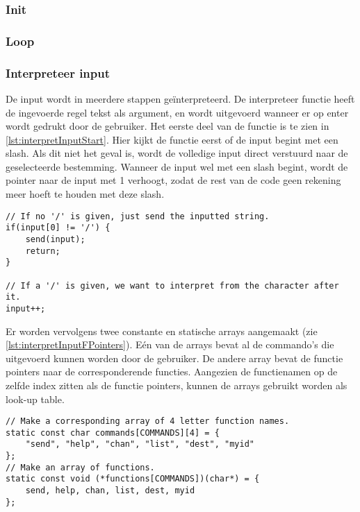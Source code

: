 \subsubsection{Init}


\subsubsection{Loop}


\subsubsection{Interpreteer input}

De input wordt in meerdere stappen geïnterpreteerd. De interpreteer functie heeft de ingevoerde regel tekst als argument, en wordt uitgevoerd wanneer er op enter wordt gedrukt door de gebruiker.
Het eerste deel van de functie is te zien in \autoref{lst:interpretInputStart}. Hier kijkt de functie eerst of de input begint met een slash. Als dit niet het geval is, wordt de volledige input direct verstuurd naar de geselecteerde bestemming. Wanneer de input wel met een slash begint, wordt de pointer naar de input met 1 verhoogt, zodat de rest van de code geen rekening meer hoeft te houden met deze slash.

\begin{lstlisting}[caption={Eerste deel van de interpreter},captionpos=b,label={lst:interpretInputStart},style=c,xleftmargin=.\textwidth,xrightmargin=.\textwidth]
// If no '/' is given, just send the inputted string.
if(input[0] != '/') {
    send(input);
    return;
}

// If a '/' is given, we want to interpret from the character after it.
input++;
\end{lstlisting}

Er worden vervolgens twee constante en statische arrays aangemaakt (zie \autoref{lst:interpretInputFPointers}). Eén van de arrays bevat al de commando's die uitgevoerd kunnen worden door de gebruiker. De andere array bevat de functie pointers naar de corresponderende functies.
Aangezien de functienamen op de zelfde index zitten als de functie pointers, kunnen de arrays gebruikt worden als look-up table.

\begin{lstlisting}[caption={De look-up table van de interpreter},captionpos=b,label={lst:interpretInputFPointers},style=c,xleftmargin=.\textwidth,xrightmargin=.\textwidth]
// Make a corresponding array of 4 letter function names.
static const char commands[COMMANDS][4] = {
    "send", "help", "chan", "list", "dest", "myid"
};
// Make an array of functions.
static const void (*functions[COMMANDS])(char*) = {
    send, help, chan, list, dest, myid
};
\end{lstlisting}

